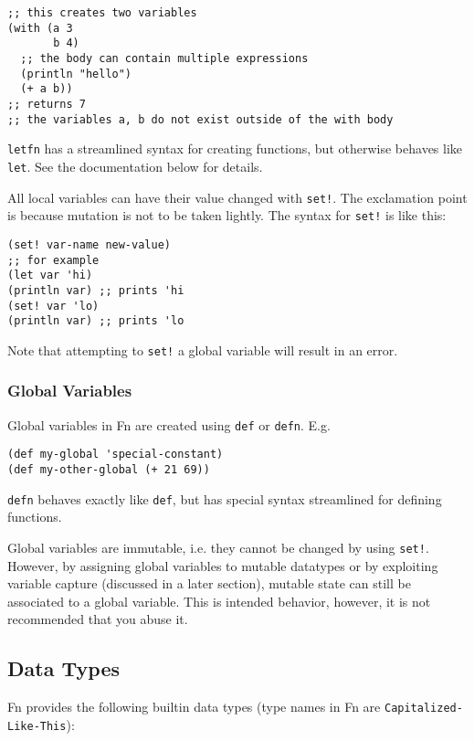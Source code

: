 \documentclass[11pt]{article}
\begin{document}
\begin{verbatim}
;; this creates two variables
(with (a 3
       b 4)
  ;; the body can contain multiple expressions
  (println "hello")
  (+ a b))
;; returns 7
;; the variables a, b do not exist outside of the with body
\end{verbatim}

\texttt{letfn} has a streamlined syntax for creating functions, but otherwise behaves
like \texttt{let}. See the documentation below for details.

All local variables can have their value changed with \texttt{set!}. The exclamation
point is because mutation is not to be taken lightly. The syntax for \texttt{set!} is
like this:

\begin{verbatim}
(set! var-name new-value)
;; for example
(let var 'hi)
(println var) ;; prints 'hi
(set! var 'lo)
(println var) ;; prints 'lo
\end{verbatim}

Note that attempting to \texttt{set!} a global variable will result in an error.


\subsubsection{Global Variables}
\label{sec:org51a388d}

Global variables in Fn are created using \texttt{def} or \texttt{defn}. E.g.

\begin{verbatim}
(def my-global 'special-constant)
(def my-other-global (+ 21 69))
\end{verbatim}

\texttt{defn} behaves exactly like \texttt{def}, but has special syntax streamlined for defining
functions.

Global variables are immutable, i.e. they cannot be changed by using \texttt{set!}.
However, by assigning global variables to mutable datatypes or by exploiting
variable capture (discussed in a later section), mutable state can still be
associated to a global variable. This is intended behavior, however, it is not
recommended that you abuse it.


\subsection{Data Types}
\label{sec:org6918fb9}

Fn provides the following builtin data types (type names in Fn are
\texttt{Capitalized-Like-This}):
\end{document}
